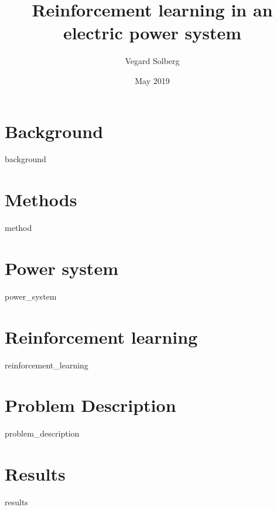 \documentclass{book}
\title{Reinforcement learning in an electric power system}
\author{Vegard Solberg}
\date{May 2019}
\begin{document}
 
    \maketitle
    \tableofcontents
    
    \chapter{Background}
    {background}
    
    \chapter{Methods}
    {method}

    
    \chapter{Power system}
    {power_system}
 
    \chapter{Reinforcement learning}
    {reinforcement_learning}
    
    \chapter{Problem Description}
    {problem_description}
    
    \chapter{Results}
    {results}
    
    \printbibliography
 
\end{document}
